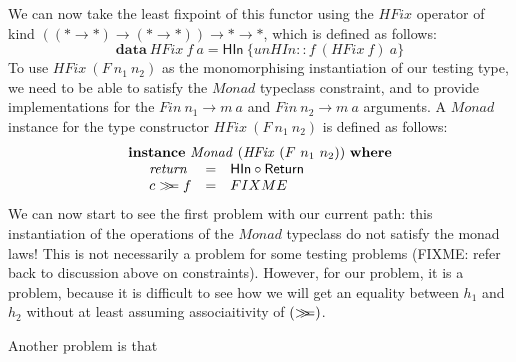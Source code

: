 \documentclass{llncs}
\newcommand{\mbind}{\mathrel{>\kern-0.45em>\kern-0.45em=}}
\begin{document}
We can now take the least fixpoint of this functor using the
$\mathit{HFix}$ operator of kind
$((* \to *) \to (* \to *)) \to * \to *$, which is defined as follows:
\begin{displaymath}
  \mathbf{data}~\mathit{HFix}~f~a = \mathsf{HIn}~\{ \mathit{unHIn} :: f~(\mathit{HFix}~f)~a \}
\end{displaymath}
To use $\mathit{HFix}~(F~n_1~n_2)$ as the monomorphising instantiation
of our testing type, we need to be able to satisfy the
$\mathit{Monad}$ typeclass constraint, and to provide implementations
for the $\mathit{Fin}~n_1 \to m~a$ and $\mathit{Fin}~n_2 \to m~a$
arguments. A $\mathit{Monad}$ instance for the type constructor
$\mathit{HFix}~(F~n_1~n_2)$ is defined as follows:
\begin{displaymath}
  \begin{array}{l}
    \mathbf{instance}~\mathit{Monad}~(\mathit{HFix}~(F~n_1~n_2))~\mathbf{where} \\
    \quad
    \begin{array}{lcl}
      \mathit{return}  &=& \mathsf{HIn} \circ \mathsf{Return} \\
      c \mbind f &=& FIXME
    \end{array}
  \end{array}
\end{displaymath}
We can now start to see the first problem with our current path: this
instantiation of the operations of the $\mathit{Monad}$ typeclass do
not satisfy the monad laws! This is not necessarily a problem for some
testing problems (FIXME: refer back to discussion above on
constraints). However, for our problem, it is a problem, because it is
difficult to see how we will get an equality between $h_1$ and $h_2$
without at least assuming associaitivity of $(\mbind)$.

Another problem is that 






\end{document}
